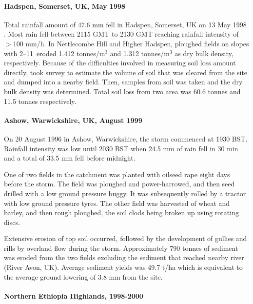 \paragraph{Hadspen, Somerset, UK, May 1998 \citep{clark2000-17}}
\label{sec:HadspenSomersetUK}
Total rainfall amount of 47.6 mm fell in Hadspen, Somerset, UK on 13 May 1998
\citep{clark2000-17}. Most rain fell between 2115 GMT to 2130 GMT reaching
rainfall intensity of $>$100 mm/h. In Nettlecombe Hill and Higher Hadspen,
ploughed fields on slopes with 2--11\textdegree\ eroded 1.412
tonnes/m$^3$ and 1.312 tonnes/m$^3$ as dry bulk density, respectively.
Because of the difficulties involved in measuring soil loss amount directly,
\citet{clark2000-17} took survey to estimate the volume of soil that was cleared
from the site and dumped into a nearby field. Then, samples from soil was taken
and the dry bulk density was determined. Total soil loss from two area was 60.6
tonnes and 11.5 tonnes respectively.

\paragraph{Ashow, Warwickshire, UK, August 1999 \citep{harrison1999-143}}
\label{sec:AshowWarwickshireUK}
On 20 August 1996 in Ashow, Warwickshire, the storm commenced at 1930 BST.
Rainfall intensity was low until 2030 BST when 24.5 mm of rain fell in 30 min
and a total of 33.5 mm fell before midnight.

One of two fields in the catchment was planted with oilseed rape eight days
before the storm. The field was ploughed and power-harrowed, and then seed
drilled with a low ground pressure buggy. It was subsequently rolled by a
tractor with low ground pressure tyres. The other field was harvested of wheat
and barley, and then rough ploughed, the soil clods being broken up using
rotating discs.

Extensive erosion of top soil occurred, followed by the development of gullies
and rills by overland flow during the storm. Approximately 790 tonnes of
sediment was eroded from the two fields excluding the sediment that reached
nearby river (River Avon, UK). Average sediment yields was 49.7 t/ha which is
equivalent to the average ground lowering of 3.8 mm from the site.

\paragraph{Northern Ethiopia Highlands, 1998-2000 \citep{nyssen2005-172}}
\label{sec:NorthernEthiopiaHighlands}

